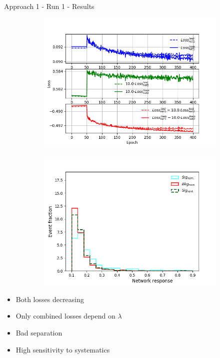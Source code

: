 \begin{frame}{Approach 1 - Run 1 - Results}
    \begin{figure}[htbp]
    \centering
    \begin{subfigure}[b]{0.47\textwidth}
        \includegraphics[width=\textwidth]{app1/full_classic_losses.png}
        \label{fig:simple:final:sepa}
    \end{subfigure}
\quad
    \begin{subfigure}[b]{0.47\textwidth}
        \includegraphics[width=\textwidth]{app1/full_classic_syst.png}
        \label{fig:simple:final:syst}
    \end{subfigure}
    \end{figure}
    \begin{itemize}
        \item Both losses decreasing
        \item Only combined losses depend on $\lambda$
        \item Bad separation
        \item High sensitivity to systematics
    \end{itemize}
\end{frame}

